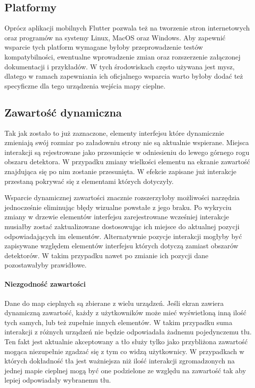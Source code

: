 \subsection{Platformy}
Oprócz aplikacji mobilnych Flutter pozwala też na tworzenie stron internetowych oraz programów na systemy Linux, MacOS oraz Windows. Aby zapewnić wsparcie tych platform wymagane byłoby przeprowadzenie testów kompatybilności, ewentualne wprowadzenie zmian oraz rozszerzenie załączonej dokumentacji i przykładów. W tych środowiskach często używana jest mysz, dlatego w ramach zapewniania ich oficjalnego wsparcia warto byłoby dodać też specyficzne dla tego urządzenia wejścia mapy cieplne.

\subsection{Zawartość dynamiczna}
Tak jak zostało to już zaznaczone, elementy interfejsu które dynamicznie zmieniają swój rozmiar po załadowniu strony nie są aktualnie wspierane. Miejsca interakcji są rejestrowane jako przesunięcie w odniesieniu do lewego górnego rogu obszaru detektora. W przypadku zmiany wielkości elementu na ekranie zawartość znajdująca się po nim zostanie przesunięta. W efekcie zapisane już interakcje przestaną pokrywać się z elementami których dotyczyły. 

Wsparcie dynamicznej zawartości znacznie rozszerzyłoby możliwości narzędzia jednocześnie eliminując błędy wizualne powstałe z jego braku. Po wykryciu zmiany w drzewie elementów interfejsu zarejestrowane wcześniej interakcje musiałby zostać zaktualizowane dostosowując ich miejsce do aktualnej pozycji odpowiadających im elementów. Alternatywnie pozycje interakcji mogłyby być zapisywane względem elementów interfejsu których dotyczą zamiast obszarów detektorów. W takim przypadku nawet po zmianie ich pozycji dane pozostawałyby prawidłowe.

\paragraph{Niezgodność zawartości}
Dane do map cieplnych są zbierane z wielu urządzeń. Jeśli ekran zawiera dynamiczną zawartość, każdy z użytkowników może mieć wyświetloną inną ilość tych samych, lub też zupełnie innych elementów. W takim przypadku suma interakcji z różnych urządzeń nie będzie odpowiadała żadnemu pojedynczemu tłu. Ten fakt jest aktualnie akceptowany a tło służy tylko jako przybliżona zawartość mogąca niezupełnie zgadzać się z tym co widzą użytkownicy. W przypadkach w których dokładność tła jest ważniejsza niż ilość interakcji zgromadzonych na jednej mapie cieplnej mogą być one podzielone ze względu na zawartość tak aby lepiej odpowiadały wybranemu tłu.

